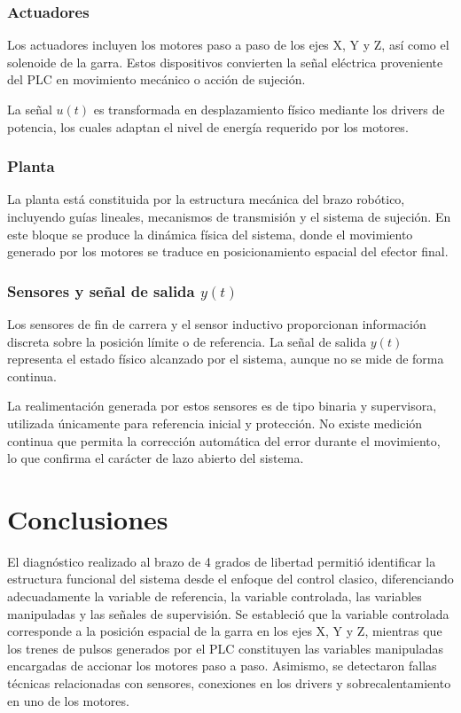 \documentclass[a4paper,12pt]{article}
\begin{document}
\subsubsection{Actuadores}

Los actuadores incluyen los motores paso a paso de los ejes X, Y y Z, así como el solenoide de la garra. Estos dispositivos convierten la señal eléctrica proveniente del PLC en movimiento mecánico o acción de sujeción.

La señal $u(t)$ es transformada en desplazamiento físico mediante los drivers de potencia, los cuales adaptan el nivel de energía requerido por los motores.

\subsubsection{Planta}

La planta está constituida por la estructura mecánica del brazo robótico, incluyendo guías lineales, mecanismos de transmisión y el sistema de sujeción. En este bloque se produce la dinámica física del sistema, donde el movimiento generado por los motores se traduce en posicionamiento espacial del efector final.

\subsubsection{Sensores y señal de salida $y(t)$}

Los sensores de fin de carrera y el sensor inductivo proporcionan información discreta sobre la posición límite o de referencia. La señal de salida $y(t)$ representa el estado físico alcanzado por el sistema, aunque no se mide de forma continua.

La realimentación generada por estos sensores es de tipo binaria y supervisora, utilizada únicamente para referencia inicial y protección. No existe medición continua que permita la corrección automática del error durante el movimiento, lo que confirma el carácter de lazo abierto del sistema.





\section{Conclusiones}

El diagnóstico realizado al brazo de 4 grados de libertad permitió identificar la estructura funcional del sistema desde el enfoque del control clasico, diferenciando adecuadamente la variable de referencia, la variable controlada, las variables manipuladas y las señales de supervisión. Se estableció que la variable controlada corresponde a la posición espacial de la garra en los ejes X, Y y Z, mientras que los trenes de pulsos generados por el PLC constituyen las variables manipuladas encargadas de accionar los motores paso a paso. Asimismo, se detectaron fallas técnicas relacionadas con sensores, conexiones en los drivers y sobrecalentamiento en uno de los motores.
\end{document}
